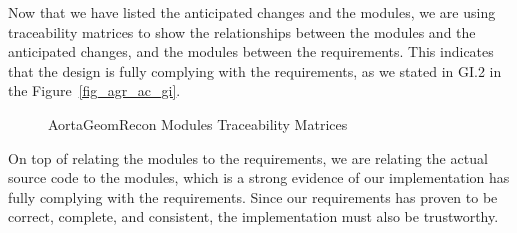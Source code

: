 Now that we have listed the anticipated changes and the modules, we are using traceability matrices to show the relationships between the modules and the anticipated changes, and the modules between the requirements. This indicates that the design is fully complying with the requirements, as we stated in GI.2 in the Figure~\ref{fig_agr_ac_gi}.

\begin{figure}[H]
    \centering
    \caption[AortaGeomRecon Modules Traceability Matrices]{AortaGeomRecon Modules Traceability Matrices}
    \label{fig_agr_mtm}
\end{figure}

On top of relating the modules to the requirements, we are relating the actual source code to the modules, which is a strong evidence of our implementation has fully complying with the requirements. Since our requirements has proven to be correct, complete, and consistent, the implementation must also be trustworthy.

